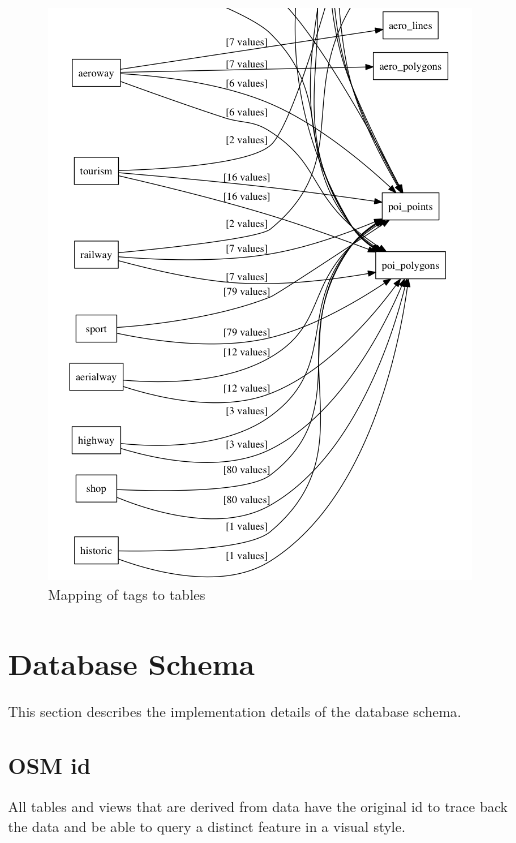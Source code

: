 \begin{figure}[H]
\centering
  \includegraphics[width=1\textwidth]{images/mapping_keys.png}
  \caption{Mapping of tags to tables}
\end{figure}
\newpage

\section{Database Schema}

This section describes the implementation details of the database schema.

\subsection{OSM id}
All tables and views that are derived from \osm{} data have the original id\cite{82_wiki.openstreetmap.org_2015}
to trace back the data and be able to query a distinct \osm{} feature in a visual style.

